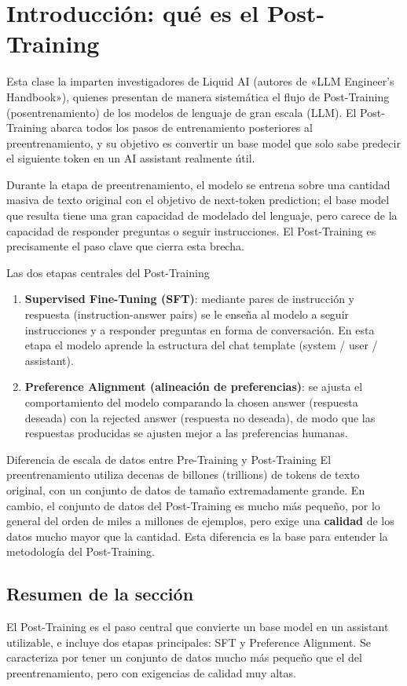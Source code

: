 \section{Introducción: qué es el Post-Training}

Esta clase la imparten investigadores de Liquid AI (autores de «LLM Engineer's Handbook»), quienes presentan de manera sistemática el flujo de Post-Training (posentrenamiento) de los modelos de lenguaje de gran escala (LLM). El Post-Training abarca todos los pasos de entrenamiento posteriores al preentrenamiento, y su objetivo es convertir un base model que solo sabe predecir el siguiente token en un AI assistant realmente útil.

Durante la etapa de preentrenamiento, el modelo se entrena sobre una cantidad masiva de texto original con el objetivo de next-token prediction; el base model que resulta tiene una gran capacidad de modelado del lenguaje, pero carece de la capacidad de responder preguntas o seguir instrucciones. El Post-Training es precisamente el paso clave que cierra esta brecha.

\begin{importantbox}{Las dos etapas centrales del Post-Training}
\begin{enumerate}
    \item \textbf{Supervised Fine-Tuning (SFT)}: mediante pares de instrucción y respuesta (instruction-answer pairs) se le enseña al modelo a seguir instrucciones y a responder preguntas en forma de conversación. En esta etapa el modelo aprende la estructura del chat template (system / user / assistant).
    \item \textbf{Preference Alignment (alineación de preferencias)}: se ajusta el comportamiento del modelo comparando la chosen answer (respuesta deseada) con la rejected answer (respuesta no deseada), de modo que las respuestas producidas se ajusten mejor a las preferencias humanas.
\end{enumerate}
\end{importantbox}

\begin{knowledgebox}{Diferencia de escala de datos entre Pre-Training y Post-Training}
El preentrenamiento utiliza decenas de billones (trillions) de tokens de texto original, con un conjunto de datos de tamaño extremadamente grande. En cambio, el conjunto de datos del Post-Training es mucho más pequeño, por lo general del orden de miles a millones de ejemplos, pero exige una \textbf{calidad} de los datos mucho mayor que la cantidad. Esta diferencia es la base para entender la metodología del Post-Training.
\end{knowledgebox}

\subsection{Resumen de la sección}

El Post-Training es el paso central que convierte un base model en un assistant utilizable, e incluye dos etapas principales: SFT y Preference Alignment. Se caracteriza por tener un conjunto de datos mucho más pequeño que el del preentrenamiento, pero con exigencias de calidad muy altas.

\newpage
